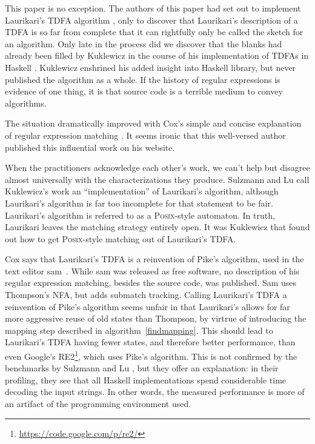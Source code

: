 \documentclass[11pt,a4paper,twoside,openright]{Thesis}
\theoremstyle{definition}
\begin{document}
This paper is no exception. The authors of this paper had set out to implement
Laurikari's TDFA algorithm \cite{Laur00a}, only to discover that Laurikari's
description of a TDFA is so far from complete that it can rightfully only be
called the sketch for an algorithm. Only late in the process did we discover
that the blanks had already been filled by Kuklewicz in the course of his
implementation of TDFAs in Haskell \cite{Kukl07a}. Kuklewicz enshrined his
added insight into Haskell library, but never published the algorithm as a
whole. If the history of regular expressions is evidence of one thing, it is
that source code is a terrible medium to convey algorithms. 

The situation dramatically improved with Cox's simple and concise
explanation of regular expression matching \cite{Cox07a}. It seems
ironic that this well-versed author published this influential work
on his website.

When the practitioners acknowledge each other's work, we can't
help but disagree almost universally with the characterizations they
produce. Sulzmann and Lu \cite{Sulz12a} call Kuklewicz's
work an ``implementation'' of Laurikari's algorithm, although Laurikari's
algorithm is far too incomplete for that statement to be fair. Laurikari's
algorithm is referred to as a \textsc{Posix}-style automaton. In truth, Laurikari
leaves the matching strategy entirely open. It was Kuklewicz that
found out how to get \textsc{Posix}-style matching out of Laurikari's TDFA. 

Cox says that Laurikari's TDFA is a reinvention of Pike's algorithm,
used in the text editor sam~\cite{Pike87a}.  While sam was released
as free software, no description of his regular expression matching,
besides the source code, was published.  Sam uses Thompson's NFA,
but adds submatch tracking. Calling Laurikari's TDFA a reinvention of Pike's
algorithm seems unfair in that Laurikari's allows for far more aggressive reuse
of old states than Thompson, by virtrue of introducing the mapping step 
described in algorithm~\ref{findmapping}. This should lead to Laurikari's TDFA
having fewer
states, and therefore better performance, than even Google's
RE2\footnote{\url{https://code.google.com/p/re2/}}, which uses Pike's
algorithm. This is not confirmed by the benchmarks by Sulzmann and Lu
\cite{Sulz12a}, but they offer an explanation: in their profiling, they see
that all Haskell implementations spend considerable time decoding the input
strings. In other words, the measured performance is more of an artifact of the
programming environment used.
\end{document}
